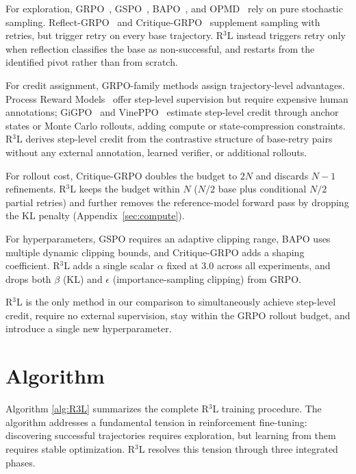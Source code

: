 \documentclass[11pt]{article}
\theoremstyle{definition}
\theoremstyle{remark}
\begin{document}
For exploration, GRPO~\cite{shao2024deepseekmath}, GSPO~\cite{zheng2025group}, BAPO~\cite{xi2025bapo}, and OPMD~\cite{yao2025group} rely on pure stochastic sampling. Reflect-GRPO~\cite{bensal2025reflect} and Critique-GRPO~\cite{zhang2025critique} supplement sampling with retries, but trigger retry on every base trajectory. R$^3$L instead triggers retry only when reflection classifies the base as non-successful, and restarts from the identified pivot rather than from scratch.

For credit assignment, GRPO-family methods assign trajectory-level advantages. Process Reward Models~\cite{wang2024math,lightman2023let} offer step-level supervision but require expensive human annotations; GiGPO~\cite{feng2025group} and VinePPO~\cite{kazemnejad2024vineppo} estimate step-level credit through anchor states or Monte Carlo rollouts, adding compute or state-compression constraints. R$^3$L derives step-level credit from the contrastive structure of base-retry pairs without any external annotation, learned verifier, or additional rollouts.

For rollout cost, Critique-GRPO doubles the budget to $2N$ and discards $N{-}1$ refinements. R$^3$L keeps the budget within $N$ ($N/2$ base plus conditional $N/2$ partial retries) and further removes the reference-model forward pass by dropping the KL penalty (Appendix~\ref{sec:compute}).

For hyperparameters, GSPO requires an adaptive clipping range, BAPO uses multiple dynamic clipping bounds, and Critique-GRPO adds a shaping coefficient. R$^3$L adds a single scalar $\alpha$ fixed at $3.0$ across all experiments, and drops both $\beta$ (KL) and $\epsilon$ (importance-sampling clipping) from GRPO.

R$^3$L is the only method in our comparison to simultaneously achieve step-level credit, require no external supervision, stay within the GRPO rollout budget, and introduce a single new hyperparameter.

\section{Algorithm}
\label{sec:algorithm}

Algorithm \ref{alg:R3L} summarizes the complete R$^3$L training procedure. The algorithm addresses a fundamental tension in reinforcement fine-tuning: discovering successful trajectories requires exploration, but learning from them requires stable optimization. R$^3$L resolves this tension through three integrated phases.
\end{document}

